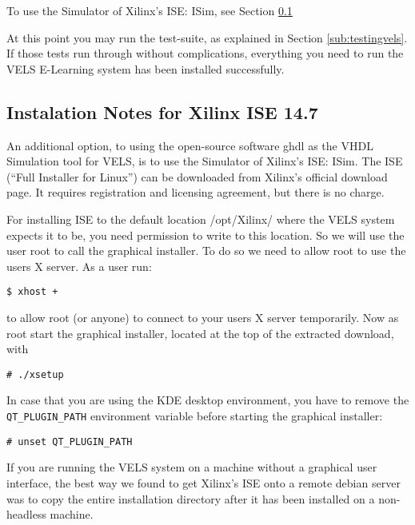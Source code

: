 To use the Simulator of Xilinx's ISE: ISim, see Section \ref{ISE-install}

At this point you may run the test-suite, as explained in Section \ref{sub:testingvels}.
If those tests run through without complications, everything you need to run the VELS
E-Learning system has been installed successfully.

\subsection{Instalation Notes for Xilinx ISE 14.7}\label{ISE-install}

An additional option, to using the open-source software ghdl as the VHDL Simulation tool for VELS, is to use the Simulator of Xilinx's ISE: ISim. The ISE (``Full Installer for Linux'') can be downloaded from Xilinx's official download page. It requires registration and licensing agreement, but there is no charge.

For installing ISE to the default location /opt/Xilinx/ where the VELS system expects it to be, you need permission to write to this location. So we will use the user root to call the graphical installer. To do so we need to allow root to use the users X server. As a user run:

\begin{verbatim}
$ xhost +
\end{verbatim}

to allow root (or anyone) to connect to your users X server temporarily. Now as root start the graphical installer, located at the top of the extracted download, with

\begin{verbatim}
# ./xsetup
\end{verbatim}

In case that you are using the KDE desktop environment, you have to remove the \verb!QT_PLUGIN_PATH! environment variable before starting the graphical installer:

\begin{verbatim}
# unset QT_PLUGIN_PATH
\end{verbatim}

If you are running the VELS system on a machine without a graphical user interface, the best way we found to get Xilinx's ISE onto a remote debian server was to copy the entire installation directory after it has been installed on a non-headless machine.
